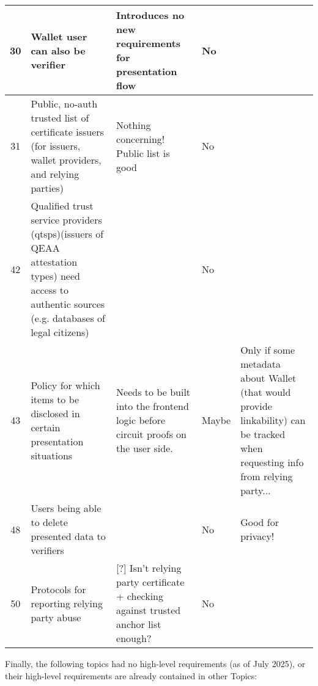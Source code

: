 \begin{longtable}{|c|p{}|p{}|p{}|p{}|}
30 & Wallet user can also be verifier & Introduces no new requirements for presentation flow & No & \\
\hline

31 & Public, no-auth trusted list of certificate issuers (for issuers, wallet providers, and relying parties) & Nothing concerning! Public list is good & No & \\
\hline

42 & Qualified trust service providers (qtsps)(issuers of QEAA attestation types) need access to authentic sources (e.g. databases of legal citizens) & & No & \\
\hline

43 & Policy for which items to be disclosed in certain presentation situations & Needs to be built into the frontend logic before circuit proofs on the user side. & Maybe & Only if some metadata about Wallet (that would provide linkability) can be tracked when requesting info from relying party... \\
\hline

48 & Users being able to delete presented data to verifiers & & No & Good for privacy! \\
\hline

50 & Protocols for reporting relying party abuse & [?] Isn't relying party certificate + checking against trusted anchor list enough? & No & \\
\hline

\end{longtable}


Finally, the following topics had no high-level requirements (as of July 2025), or their high-level requirements are already contained in other Topics:

